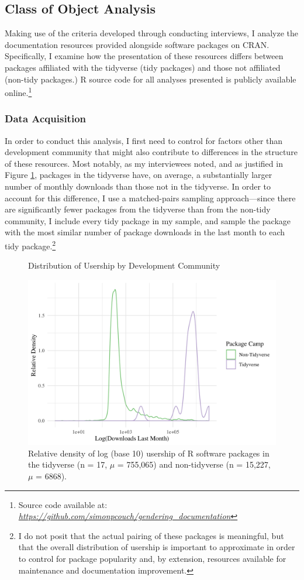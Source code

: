 \subsection{Class of Object Analysis}\label{sec:coa}

Making use of the criteria developed through conducting interviews, I analyze the documentation resources provided alongside software packages on CRAN. Specifically, I examine how the presentation of these resources differs between packages affiliated with the tidyverse (tidy packages) and those not affiliated (non-tidy packages.) R source code for all analyses presented is publicly available online.\footnote{Source code available at: \href{https://github.com/simonpcouch/gendering_documentation}{\textit{https://github.com/simonpcouch/gendering\_documentation}}}


\subsubsection{Data Acquisition} \hspace{10pt} In order to conduct this analysis, I first need to control for factors other than development community that might also contribute to differences in the structure of these resources. Most notably, as my interviewees noted, and as justified in Figure \ref{fig:users}, packages in the tidyverse have, on average, a substantially larger number of monthly downloads than those not in the tidyverse. In order to account for this difference, I use a matched-pairs sampling approach---since there are significantly fewer packages from the tidyverse than from the non-tidy community, I include every tidy package in my sample, and sample the package with the most similar number of package downloads in the last month to each tidy package.\footnote{I do not posit that the actual pairing of these packages is meaningful, but that the overall distribution of usership is important to approximate in order to control for package popularity and, by extension, resources available for maintenance and documentation improvement.}

\begin{figure} [!htb]
    \caption{Distribution of Usership by Development Community}
    \centering
    \includegraphics[width=.7\linewidth]{figures/downloads_by_camp.png}
    \captionsetup{width=0.8\textwidth}
    \caption*{Relative density of log (base 10) usership of R software packages in the tidyverse (n = 17, $\mu$ = 755,065) and non-tidyverse (n = 15,227, $\mu$ = 6868).}
    \label{fig:users}
\end{figure}

